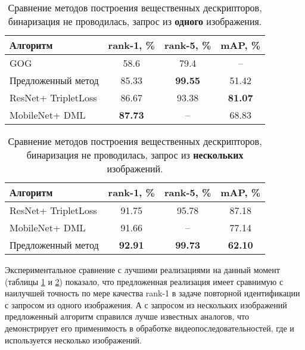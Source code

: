 \documentclass[a4paper]{article}
\begin{document}
\begin{multicols*}{2}
\begin{table}[H]\small
    \caption{Сравнение методов построения вещественных дескрипторов, бинаризация не проводилась, запрос из \textbf{одного} изображения.}
    \label{comparesingle}
    \centering\medskip%
    \begin{tabular}{ p{2.3cm} c c c } 
        \hline 
        Алгоритм & rank-1, \% & rank-5, \% & mAP, \% \\
        \hline
        GOG \cite{review1} & 58.6 & 79.4 & -- \\
        Предложенный метод & 85.33 & \textbf{99.55} & 51.42 \\
        ResNet+ TripletLoss \cite{resnet} & 86.67 & 93.38 & \textbf{81.07} \\
        MobileNet+ DML \cite{dml} & \textbf{87.73} & -- & 68.83 \\
        \hline
    \end{tabular}
\end{table}

\begin{table}[H]\small
    \caption{Сравнение методов построения вещественных дескрипторов, бинаризация не проводилась, запрос из \textbf{нескольких} изображений.}
    \label{comparemultiple}
    \centering\medskip%
    \begin{tabular}{ p{2.3cm} c c c } 
        \hline 
        Алгоритм & rank-1, \% & rank-5, \% & mAP, \% \\
        \hline
        ResNet+ TripletLoss\cite{resnet} & 91.75 & 95.78 & 87.18 \\
        MobileNet+ DML\cite{dml} & 91.66 & -- & 77.14 \\
        Предложенный метод & \textbf{92.91} & \textbf{99.73} & \textbf{62.10} \\
        \hline
    \end{tabular}
\end{table}

Экспериментальное сравнение с лучшими реализациями на данный момент (таблицы \ref{comparesingle} и \ref{comparemultiple}) показало, что предложенная реализация имеет сравнимую с наилучшей точность по мере качества rank-1 в задаче повторной идентификации с запросом из одного изображения. А с запросом из нескольких изображений предложенный алгоритм справился лучше известных аналогов, что демонстрирует его применимость в обработке видеопоследовательностей, где и используется несколько изображений.


\end{multicols*}
\end{document}
